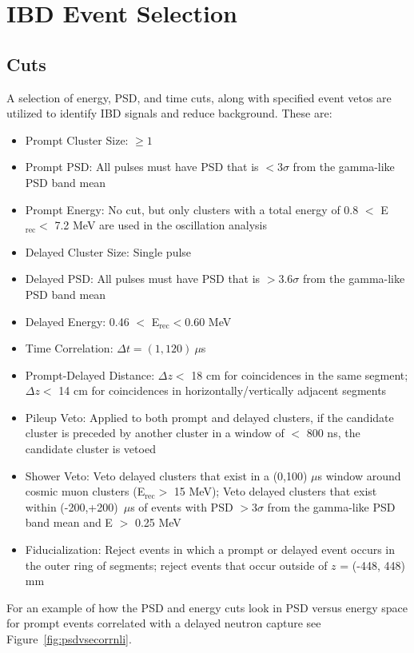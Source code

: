 \section{IBD Event Selection}

\subsection{Cuts}

A selection of energy, PSD, and time cuts, along with specified event vetos are utilized to identify IBD signals and reduce background.
These are:
\begin{itemize}
	\item Prompt Cluster Size: $\geq1$
	\item Prompt PSD: All pulses must have PSD that is $<3\sigma$ from the gamma-like PSD band mean
	\item Prompt Energy: No cut, but only clusters with a total energy of 0.8 $<$ E$_{\textrm{rec}} <$ 7.2 MeV are used in the oscillation analysis
	\item Delayed Cluster Size: Single pulse
	\item Delayed PSD: All pulses must have PSD that is $>3.6\sigma$ from the gamma-like PSD band mean
	\item Delayed Energy: 0.46 $<$ E$_{\textrm{rec}} < $0.60 MeV
	\item Time Correlation: $\Delta t = (1,120)~\mu$s
	\item Prompt-Delayed Distance: $\Delta z <$ 18 cm for coincidences in the same segment; $\Delta z <$ 14 cm for coincidences in horizontally/vertically adjacent segments
	\item Pileup Veto: Applied to both prompt and delayed clusters, if the candidate cluster is preceded by another cluster in a window of $<$ 800 ns, the candidate cluster is vetoed
	\item Shower Veto: Veto delayed clusters that exist in a (0,100) $\mu$s window around cosmic muon clusters (E$_{\textrm{rec}} >$ 15 MeV); Veto delayed clusters that exist within (-200,+200)~$\mu$s of events with PSD $> 3\sigma$ from the gamma-like PSD band mean and E $>$ 0.25 MeV
	\item Fiducialization: Reject events in which a prompt or delayed event occurs in the outer ring of segments; reject events that occur outside of $z$ = (-448, 448) mm 
\end{itemize}
For an example of how the PSD and energy cuts look in PSD versus energy space for prompt events correlated with a delayed neutron capture see Figure~\ref{fig:psdvsecorrnli}.

